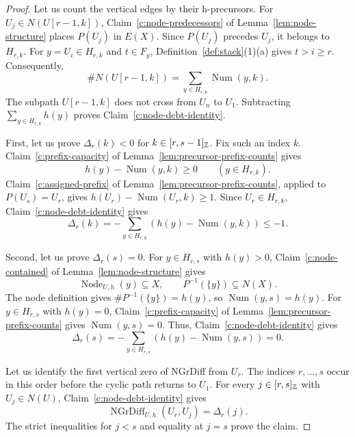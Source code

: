 \begin{proof}
 Let us count the vertical edges by their h-precursors.
For $U_j\in N(U[r-1,k])$, Claim~\ref{c:node-predecessors} of
Lemma~\ref{lem:node-structure} places $P(U_j)$ in $E(X)$.
Since $P(U_j)$ precedes $U_j$, it belongs to $H_{r,k}$.
For $y=U_i\in H_{r,k}$ and $t\in F_y$, Definition~\ref{def:stack}(1)(a) gives $t>i\ge r$.
Consequently,
\[
 \#N(U[r-1,k])=\sum_{y\in H_{r,k}}\operatorname{Num}(y,k).
\]
The subpath $U[r-1,k]$ does not cross from $U_n$ to $U_1$. Subtracting $\sum_{y\in H_{r,k}}h(y)$
proves Claim~\ref{c:node-debt-identity}.

 First, let us prove $\Delta_r(k)<0$ for $k\in[r,s-1]_{\mathbb Z}$.
Fix such an index $k$.
Claim~\ref{c:prefix-capacity} of Lemma~\ref{lem:precursor-prefix-counts} gives
\[
 h(y)-\operatorname{Num}(y,k)\ge0\qquad(y\in H_{r,k}).
\]
Claim~\ref{c:assigned-prefix} of Lemma~\ref{lem:precursor-prefix-counts}, applied to $P(U_s)=U_r$, gives
$h(U_r)-\operatorname{Num}(U_r,k)\ge1$.
Since $U_r\in H_{r,k}$, Claim~\ref{c:node-debt-identity} gives
\[
 \Delta_r(k)=-\sum_{y\in H_{r,k}}(h(y)-\operatorname{Num}(y,k))\le-1.
\]

Second, let us prove $\Delta_r(s)=0$.
For $y\in H_{r,s}$ with $h(y)>0$, Claim~\ref{c:node-contained} of Lemma~\ref{lem:node-structure} gives
\[
 \operatorname{Node}_{U,h}(y)\subseteq X,\qquad
 P^{-1}(\{y\})\subseteq N(X).
\]
The node definition gives $\#P^{-1}(\{y\})=h(y)$, so $\operatorname{Num}(y,s)=h(y)$.
For $y\in H_{r,s}$ with $h(y)=0$, Claim~\ref{c:prefix-capacity} of Lemma~\ref{lem:precursor-prefix-counts} gives $\operatorname{Num}(y,s)=0$.
Thus, Claim~\ref{c:node-debt-identity} gives
\[
 \Delta_r(s)=-\sum_{y\in H_{r,s}}(h(y)-\operatorname{Num}(y,s))=0.
\]

Let us identify the first vertical zero of NGrDiff from $U_r$.
The indices $r,\ldots,s$ occur in this order before the cyclic path returns to $U_1$.
For every $j\in[r,s]_{\mathbb Z}$ with $U_j\in N(U)$, Claim~\ref{c:node-debt-identity} gives
\[
 \operatorname{NGrDiff}_{U,h}(U_r,U_j)=\Delta_r(j).
\]
The strict inequalities for $j<s$ and equality at $j=s$ prove the claim.
\end{proof}

